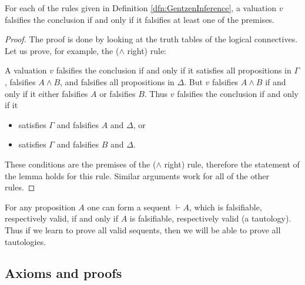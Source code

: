 \begin{page}

\begin{lem}
\label{lem:RuleTrees}
For each of the rules given in Definition \ref{dfn:GentzenInference},
a valuation $v$ falsifies the conclusion if and only if it falsifies at least one of the premises.
\end{lem}

\end{page}

\begin{page}

\begin{proof}
The proof is done by looking at the truth tables of the logical connectives.
Let us prove, for example, the ($\wedge$ right) rule:
\begin{prooftree}
\end{prooftree}
A valuation $v$ falsifies the conclusion if and only if
it satisfies all propositions in $\Gamma$, falsifies $A \wedge B$, and falsifies all propositions in $\Delta$.
But $v$ falsifies $A \wedge B$ if and only if it either falsifies $A$ or falsifies $B$.
Thus $v$ falsifies the conclusion if and only if it
\begin{itemize}
\item
satisfies $\Gamma$ and falsifies $A$ and $\Delta$, or
\item
satisfies $\Gamma$ and falsifies $B$ and $\Delta$.
\end{itemize}
These conditions are the premises of the ($\wedge$ right) rule, therefore the statement of the lemma holds for this rule.
Similar arguments work for all of the other rules.
\end{proof}

For any proposition $A$ one can form a sequent $\vdash A$, which is falsifiable, respectively valid, if and only if
$A$ is falsifiable, respectively valid (a tautology).
Thus if we learn to prove all valid sequents, then we will be able to prove all tautologies.




\end{page}

\begin{page}

\subsection{Axioms and proofs}
\label{sec:AxiomsProofs}

\end{page}

